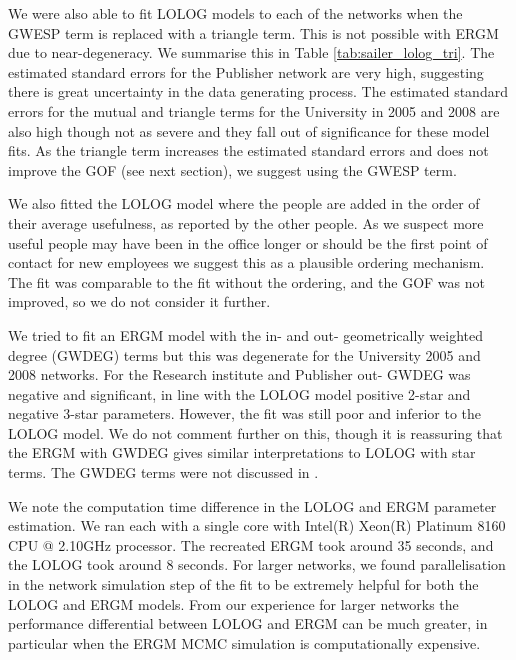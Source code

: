 \documentclass[
]{statsoc}
\begin{document}
We were also able to fit LOLOG models to each of the networks when the
GWESP term is replaced with a triangle term. This is not possible with
ERGM due to near-degeneracy. We summarise this in Table
\ref{tab:sailer_lolog_tri}. The estimated standard errors for the
Publisher network are very high, suggesting there is great uncertainty
in the data generating process. The estimated standard errors for the
mutual and triangle terms for the University in 2005 and 2008 are also
high though not as severe and they fall out of significance for these
model fits. As the triangle term increases the estimated standard errors
and does not improve the GOF (see next section), we suggest using the
GWESP term.

We also fitted the LOLOG model where the people are added in the order
of their average usefulness, as reported by the other people. As we
suspect more useful people may have been in the office longer or should
be the first point of contact for new employees we suggest this as a
plausible ordering mechanism. The fit was comparable to the fit without
the ordering, and the GOF was not improved, so we do not consider it
further.

We tried to fit an ERGM model with the in- and out- geometrically
weighted degree (GWDEG) terms but this was degenerate for the University
2005 and 2008 networks. For the Research institute and Publisher out-
GWDEG was negative and significant, in line with the LOLOG model
positive 2-star and negative 3-star parameters. However, the fit was
still poor and inferior to the LOLOG model. We do not comment further on
this, though it is reassuring that the ERGM with GWDEG gives similar
interpretations to LOLOG with star terms. The GWDEG terms were not
discussed in \cite{Sailer2012}.

We note the computation time difference in the LOLOG and ERGM parameter
estimation. We ran each with a single core with Intel(R) Xeon(R)
Platinum 8160 CPU @ 2.10GHz processor. The recreated ERGM took around 35
seconds, and the LOLOG took around 8 seconds. For larger networks, we
found parallelisation in the network simulation step of the fit to be
extremely helpful for both the LOLOG and ERGM models. From our
experience for larger networks the performance differential between
LOLOG and ERGM can be much greater, in particular when the ERGM MCMC
simulation is computationally expensive.
\end{document}
